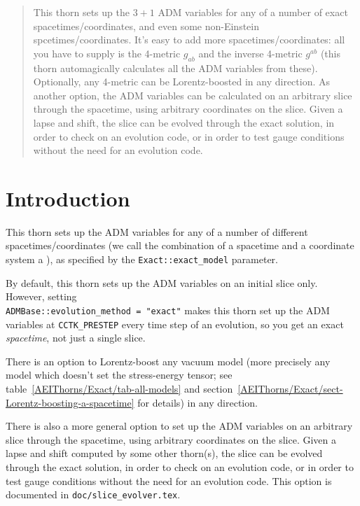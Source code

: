 \begin{abstract}
This thorn sets up the $3+1$ ADM variables for any of a number
of exact spacetimes/coordinates, and even some non-Einstein
spcetimes/coordinates.  It's easy to add more spacetimes/coordinates:
all you have to supply is the 4-metric $g_{ab}$ and the inverse 4-metric
$g^{ab}$ (this thorn automagically calculates all the ADM variables
from these).  Optionally, any 4-metric can be Lorentz-boosted in any
direction.  As another option, the ADM variables can be calculated on an
arbitrary slice through the spacetime, using arbitrary coordinates on
the slice.  Given a lapse and shift, the slice can be evolved through
the exact solution, in order to check on an evolution code, or in
order to test gauge conditions without the need for an evolution code.
\end{abstract}


\section{Introduction}

This thorn sets up the ADM variables for any of a number of
different spacetimes/coordinates (we call the combination of a
spacetime and a coordinate system a ), as specified by the
\verb|Exact::exact_model| parameter.

By default, this thorn sets up the ADM variables on an initial
slice only.  However, setting\\
\verb|ADMBase::evolution_method = "exact"|
makes this thorn set up the ADM variables at \verb|CCTK_PRESTEP|
every time step of an evolution, so you get an exact {\em spacetime\/},
not just a single slice.

There is an option to Lorentz-boost any vacuum model
(more precisely any model which doesn't set the stress-energy tensor;
see table~\ref{AEIThorns/Exact/tab-all-models} and
section~\ref{AEIThorns/Exact/sect-Lorentz-boosting-a-spacetime}
for details) in any direction.

There is also a more general option to set up the ADM variables
on an arbitrary slice through the spacetime, using arbitrary
coordinates on the slice.  Given a lapse and shift computed by some
other thorn(s), the slice can be evolved through the exact solution,
in order to check on an evolution code, or in order to test gauge
conditions without the need for an evolution code.  This option is
documented in \verb|doc/slice_evolver.tex|.

